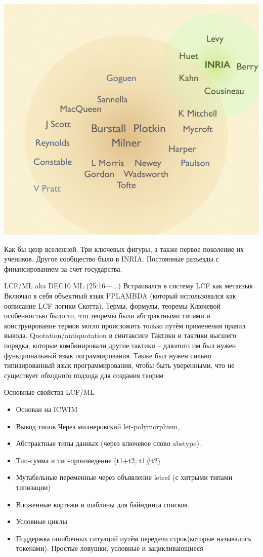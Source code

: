\documentclass[14pt]{matmex-diploma-custom}
\begin{document}
\includegraphics[angle=0,scale=0.585]{two_circles.png}

Как бы ценр вселенной. Три ключевых фигуры, а также первое поколение их учеников. Другое сообщество было в INRIA. Постоянные разъезды с финансированием за счет государства.

LCF/ML aka DEC10 ML (25:16---...)
Встраивался в систему LCF как метаязык
Включал в себя объектный язык PPLAMBDA (который использовался как оописание LCF логики Скотта). 
Термы, формулы, теоремы 
Ключевой особенностью было то, что теоремы были абстрактными типами и конструирование термов могло происзожить только путём применения правил вывода.
Quotation/antiquotation в синтаксисе
Тактики и тактики высшего порядка, которые комбинировали другие тактики -- дляэтого им был нужен функциональный язык пограммирования. Также был нужен сильно типизированный язык программирования, чтобы быть уверенными, что не существует обходного подхода для создания теорем

Основные свойства LCF/ML
\begin{itemize}
  \item Основан на ICWIM
  \item Вывод типов Через милнеровский let-polymorphism,
  \item Абстрактные типы данных (через ключевое слово abstype).
  \item Тип-сумма и тип-произведение (t1+t2, t1\#t2)
  \item Мутабельные переменные через объявление letref (с хитрыми типами типизации)
  \item Вложенные кортежи и шаблоны для байндинга списков.
  \item Условные циклы
  \item Поддержка ошибочных ситуаций путём передачи строк(которые назывались токенами). Простые ловушки, условные и зацикливающиеся 
\end{itemize}
\end{document}
